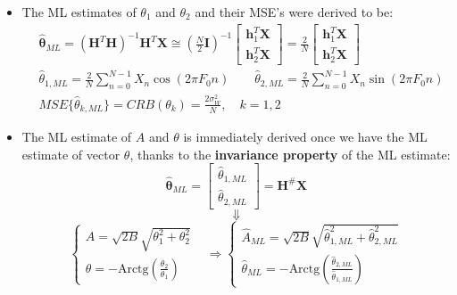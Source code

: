 \begin{itemize}
\item The ML estimates of \(\theta_1\) and \(\theta_2\) and their MSE's were derived to be:
\begin{align*}
&\hat{\boldsymbol{\theta}}_{ML} = (\mathbf{H}^{T}\mathbf{H})^{-1}\mathbf{H}^{T}\mathbf{X} \cong \left(\frac{N}{2}\mathbf{I}\right)^{-1}\begin{bmatrix} \mathbf{h}_{1}^{T}\mathbf{X} \\ \mathbf{h}_{2}^{T}\mathbf{X} \end{bmatrix} = \frac{2}{N}\begin{bmatrix} \mathbf{h}_{1}^{T}\mathbf{X} \\ \mathbf{h}_{2}^{T}\mathbf{X} \end{bmatrix} \\[1em]
&\hat{\theta}_{1,ML} = \frac{2}{N}\sum_{n=0}^{N-1} X_{n}\cos(2\pi F_{0}n) \qquad\hat{\theta}_{2,ML} = \frac{2}{N}\sum_{n=0}^{N-1} X_{n}\sin(2\pi F_{0}n) \\[1em]
&MSE\{\hat{\theta}_{k,ML}\} = CRB(\theta_{k}) = \frac{2\sigma_{W}^{2}}{N}, \quad k=1,2
\end{align*}

\item The ML estimate of \(A\) and \(\theta\) is immediately derived once we have the ML estimate of vector \(\theta\), thanks to the \textbf{invariance property} of the ML estimate:
\[
\hat{\boldsymbol{\theta}}_{ML}=\begin{bmatrix}
    \hat{\theta}_{1,ML}\\[4pt]
    \hat{\theta}_{2,ML}
\end{bmatrix}=\mathbf{H}^{\#}\mathbf{X}
\]
\[
\Downarrow
\]\[
\begin{cases}
A = \sqrt{2B} \sqrt{\theta_{1}^{2} + \theta_{2}^{2}} & \\
\theta = -\text{Arctg} \left(\frac{\theta_{2}}{\theta_{1}}\right)
\end{cases}
\Rightarrow
\begin{cases}
\hat{A}_{ML} = \sqrt{2B} \sqrt{\hat{\theta}_{1,ML}^{2} + \hat{\theta}_{2,ML}^{2}} \\
\hat{\theta}_{ML} = -\text{Arctg} \left(\frac{\hat{\theta}_{2,ML}}{\hat{\theta}_{1,ML}}\right)
\end{cases}\]
\end{itemize}
